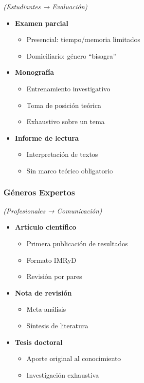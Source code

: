 \documentclass[
  11pt,
]{beaner}
\providecommand{\tightlist}{%
  \setlength{\itemsep}{0pt}\setlength{\parskip}{0pt}}
\begin{document}
\emph{(Estudiantes → Evaluación)}

\begin{itemize}
\tightlist
\item
  \textbf{Examen parcial}

  \begin{itemize}
  \tightlist
  \item
    Presencial: tiempo/memoria limitados
  \item
    Domiciliario: género ``bisagra''
  \end{itemize}
\item
  \textbf{Monografía}

  \begin{itemize}
  \tightlist
  \item
    Entrenamiento investigativo
  \item
    Toma de posición teórica
  \item
    Exhaustivo sobre un tema
  \end{itemize}
\item
  \textbf{Informe de lectura}

  \begin{itemize}
  \tightlist
  \item
    Interpretación de textos
  \item
    Sin marco teórico obligatorio
  \end{itemize}
\end{itemize}

\subsubsection{Géneros Expertos}\label{guxe9neros-expertos}

\emph{(Profesionales → Comunicación)}

\begin{itemize}
\tightlist
\item
  \textbf{Artículo científico}

  \begin{itemize}
  \tightlist
  \item
    Primera publicación de resultados
  \item
    Formato IMRyD
  \item
    Revisión por pares
  \end{itemize}
\item
  \textbf{Nota de revisión}

  \begin{itemize}
  \tightlist
  \item
    Meta-análisis
  \item
    Síntesis de literatura
  \end{itemize}
\item
  \textbf{Tesis doctoral}

  \begin{itemize}
  \tightlist
  \item
    Aporte original al conocimiento
  \item
    Investigación exhaustiva
  \end{itemize}
\end{itemize}
\end{document}
